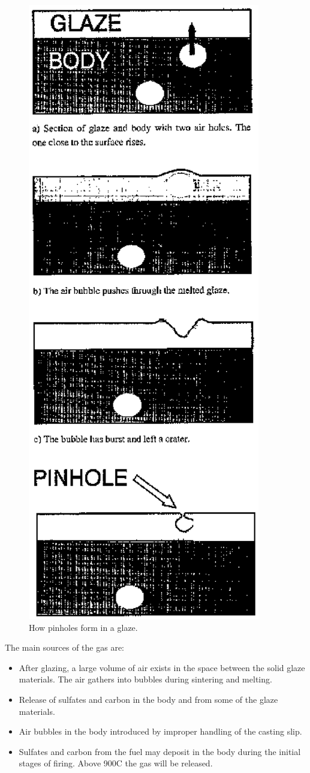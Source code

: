 \begin{figure}[htbp!]
  \centering
  \includegraphics[width=0.6\linewidth]{img/pinholing.eps}
  \caption{How pinholes form in a glaze.}
  \label{fig:pinholing}
\end{figure}
The main sources of the gas are:
\begin{itemize}
\item After glazing, a large volume of air exists in the space between the 
solid glaze materials. The air gathers into bubbles during sintering and 
melting.
\item Release of sulfates and carbon in the body and from some of the glaze 
materials.
\item Air bubbles in the body introduced by improper handling of the casting 
slip.
\item Sulfates and carbon from the fuel may deposit in the body during the 
initial stages of firing. Above 900\degree C the gas will be released.
\end{itemize}

